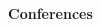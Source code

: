 \documentclass[11pt,twoside,a4paper]{article}
\begin{document}
\nocite{*}

\begin{thebibliography}{99999}

    {\bf Conferences}
    \\
  
  
\end{thebibliography}
\end{document}
